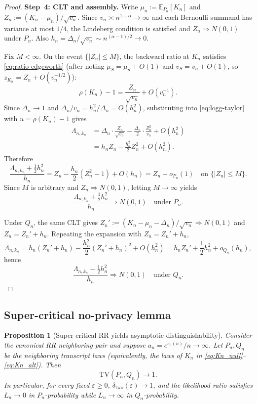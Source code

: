 \documentclass{article}
\newtheorem{proposition}[theorem]{Proposition}
\begin{document}
\begin{proof}
\medskip
\textbf{Step~4: CLT and assembly.}
Write $\mu_n:=\mathbb E_{P_n}[K_n]$ and $Z_n:=(K_n-\mu_n)/\sqrt{v_n}$.
Since $v_n\asymp n^{1-\alpha}\to\infty$ and each Bernoulli summand has variance at most $1/4$,
the Lindeberg condition is satisfied and $Z_n\Rightarrow N(0,1)$ under $P_n$.
Also $h_n=\Delta_n/\sqrt{v_n}\sim n^{(\alpha-1)/2}\to 0$.

Fix $M<\infty$. On the event $\{|Z_n|\le M\}$, the backward ratio at $K_n$ satisfies
\eqref{eq:ratio-edgeworth} (after noting $\mu_S=\mu_n+O(1)$ and $v_S=v_n+O(1)$, so
$z_{K_n}=Z_n+O(v_n^{-1/2})$):
\[
\rho(K_n)-1=\frac{Z_n}{\sqrt{v_n}}+O(v_n^{-1}).
\]
Since $\Delta_n\to 1$ and $\Delta_n/v_n=h_n^2/\Delta_n=O(h_n^2)$, substituting into
\eqref{eq:logg-taylor} with $u=\rho(K_n)-1$ gives
\begin{align*}
\Lambda_{n,k_n}
&=\Delta_n\cdot\frac{Z_n}{\sqrt{v_n}}
 -\frac{\Delta_n}{2}\cdot\frac{Z_n^2}{v_n}
 +O(h_n^2)\\
&=h_n Z_n-\frac{h_n^2}{2}Z_n^2+O(h_n^2).
\end{align*}
Therefore
\[
\frac{\Lambda_{n,k_n}+\frac12 h_n^2}{h_n}
=Z_n-\frac{h_n}{2}(Z_n^2-1)+O(h_n)
=Z_n+o_{P_n}(1)
\quad\text{on }\{|Z_n|\le M\}.
\]
Since $M$ is arbitrary and $Z_n\Rightarrow N(0,1)$, letting $M\to\infty$ yields
\[
\frac{\Lambda_{n,k_n}+\frac12 h_n^2}{h_n}\Longrightarrow N(0,1)
\quad\text{under }P_n.
\]

Under $Q_n$, the same CLT gives $Z_n':=(K_n-\mu_n-\Delta_n)/\sqrt{v_n}\Rightarrow N(0,1)$
and $Z_n=Z_n'+h_n$. Repeating the expansion with $Z_n=Z_n'+h_n$,
\[
\Lambda_{n,k_n}=h_n(Z_n'+h_n)-\frac{h_n^2}{2}(Z_n'+h_n)^2+O(h_n^2)
=h_n Z_n'+\frac12 h_n^2+o_{Q_n}(h_n),
\]
hence
\[
\frac{\Lambda_{n,k_n}-\frac12 h_n^2}{h_n}\Longrightarrow N(0,1)\quad\text{under }Q_n.
\]
\end{proof}



\subsection{Super-critical no-privacy lemma}

\begin{proposition}[Super-critical RR yields asymptotic distinguishability]
\label{prop:supercritical-rr}
Consider the canonical RR neighboring pair and suppose $a_n = e^{\varepsilon_0(n)}/n \to \infty$. Let $P_n, Q_n$ be the neighboring transcript laws (equivalently, the laws of $K_n$ in \eqref{eq:Kn_null}--\eqref{eq:Kn_alt}). Then
\[
\mathrm{TV}(P_n, Q_n) \to 1.
\]
In particular, for every fixed $\varepsilon \geq 0$, $\delta_{\mathrm{two}}(\varepsilon) \to 1$, and the likelihood ratio satisfies $L_n \to 0$ in
$P_n$-probability while $L_n \to \infty$ in $Q_n$-probability.
\end{proposition}
\end{document}
